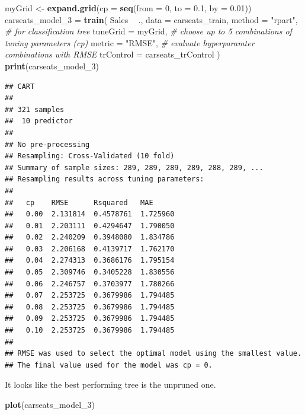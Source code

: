 \documentclass[]{book}
\newenvironment{Shaded}{\begin{snugshade}}{\end{snugshade}}
\newcommand{\CommentTok}[1]{\textcolor[rgb]{0.56,0.35,0.01}{\textit{#1}}}
\newcommand{\DataTypeTok}[1]{\textcolor[rgb]{0.13,0.29,0.53}{#1}}
\newcommand{\DecValTok}[1]{\textcolor[rgb]{0.00,0.00,0.81}{#1}}
\newcommand{\FloatTok}[1]{\textcolor[rgb]{0.00,0.00,0.81}{#1}}
\newcommand{\KeywordTok}[1]{\textcolor[rgb]{0.13,0.29,0.53}{\textbf{#1}}}
\newcommand{\NormalTok}[1]{#1}
\newcommand{\OperatorTok}[1]{\textcolor[rgb]{0.81,0.36,0.00}{\textbf{#1}}}
\newcommand{\StringTok}[1]{\textcolor[rgb]{0.31,0.60,0.02}{#1}}
\begin{document}
\begin{Shaded}
\begin{Highlighting}[]
\NormalTok{myGrid <-}\StringTok{  }\KeywordTok{expand.grid}\NormalTok{(}\DataTypeTok{cp =} \KeywordTok{seq}\NormalTok{(}\DataTypeTok{from =} \DecValTok{0}\NormalTok{, }\DataTypeTok{to =} \FloatTok{0.1}\NormalTok{, }\DataTypeTok{by =} \FloatTok{0.01}\NormalTok{))}
\NormalTok{carseats_model_}\DecValTok{3}\NormalTok{ =}\StringTok{ }\KeywordTok{train}\NormalTok{(}
\NormalTok{   Sales }\OperatorTok{~}\StringTok{ }\NormalTok{., }
   \DataTypeTok{data =}\NormalTok{ carseats_train, }
   \DataTypeTok{method =} \StringTok{"rpart"}\NormalTok{,  }\CommentTok{# for classification tree}
   \DataTypeTok{tuneGrid =}\NormalTok{ myGrid,  }\CommentTok{# choose up to 5 combinations of tuning parameters (cp)}
   \DataTypeTok{metric =} \StringTok{"RMSE"}\NormalTok{,  }\CommentTok{# evaluate hyperparamter combinations with RMSE}
   \DataTypeTok{trControl =}\NormalTok{ carseats_trControl}
\NormalTok{)}
\KeywordTok{print}\NormalTok{(carseats_model_}\DecValTok{3}\NormalTok{)}
\end{Highlighting}
\end{Shaded}

\begin{verbatim}
## CART 
## 
## 321 samples
##  10 predictor
## 
## No pre-processing
## Resampling: Cross-Validated (10 fold) 
## Summary of sample sizes: 289, 289, 289, 289, 288, 289, ... 
## Resampling results across tuning parameters:
## 
##   cp    RMSE      Rsquared   MAE     
##   0.00  2.131814  0.4578761  1.725960
##   0.01  2.203111  0.4294647  1.790050
##   0.02  2.240209  0.3948080  1.834786
##   0.03  2.206168  0.4139717  1.762170
##   0.04  2.274313  0.3686176  1.795154
##   0.05  2.309746  0.3405228  1.830556
##   0.06  2.246757  0.3703977  1.780266
##   0.07  2.253725  0.3679986  1.794485
##   0.08  2.253725  0.3679986  1.794485
##   0.09  2.253725  0.3679986  1.794485
##   0.10  2.253725  0.3679986  1.794485
## 
## RMSE was used to select the optimal model using the smallest value.
## The final value used for the model was cp = 0.
\end{verbatim}

It looks like the best performing tree is the unpruned one.

\begin{Shaded}
\begin{Highlighting}[]
\KeywordTok{plot}\NormalTok{(carseats_model_}\DecValTok{3}\NormalTok{)}
\end{Highlighting}
\end{Shaded}
\end{document}
